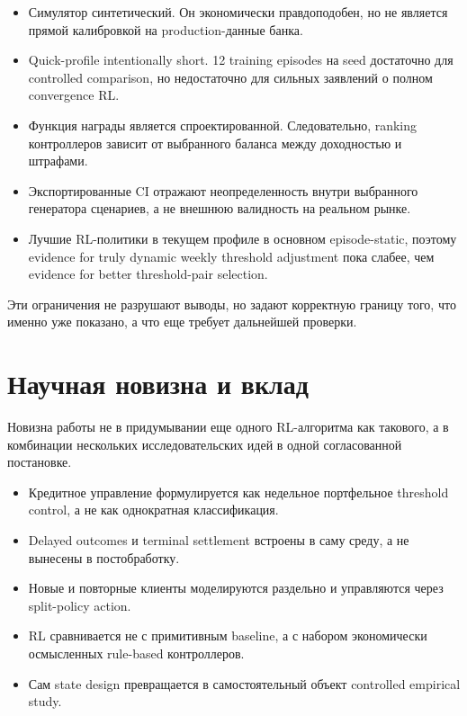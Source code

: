 \documentclass[12pt,a4paper]{article}
\begin{document}
\begin{itemize}[leftmargin=*]
    \item Симулятор синтетический. Он экономически правдоподобен, но не является прямой калибровкой на production-данные банка.
    \item Quick-profile intentionally short. 12 training episodes на seed достаточно для controlled comparison, но недостаточно для сильных заявлений о полном convergence RL.
    \item Функция награды является спроектированной. Следовательно, ranking контроллеров зависит от выбранного баланса между доходностью и штрафами.
    \item Экспортированные CI отражают неопределенность внутри выбранного генератора сценариев, а не внешнюю валидность на реальном рынке.
    \item Лучшие RL-политики в текущем профиле в основном episode-static, поэтому evidence for truly dynamic weekly threshold adjustment пока слабее, чем evidence for better threshold-pair selection.
\end{itemize}

Эти ограничения не разрушают выводы, но задают корректную границу того, что именно уже показано, а что еще требует дальнейшей проверки.

\section{Научная новизна и вклад}

Новизна работы не в придумывании еще одного RL-алгоритма как такового, а в комбинации нескольких исследовательских идей в одной согласованной постановке.
\begin{itemize}[leftmargin=*]
    \item Кредитное управление формулируется как недельное портфельное threshold control, а не как однократная классификация.
    \item Delayed outcomes и terminal settlement встроены в саму среду, а не вынесены в постобработку.
    \item Новые и повторные клиенты моделируются раздельно и управляются через split-policy action.
    \item RL сравнивается не с примитивным baseline, а с набором экономически осмысленных rule-based контроллеров.
    \item Сам state design превращается в самостоятельный объект controlled empirical study.
\end{itemize}
\end{document}
